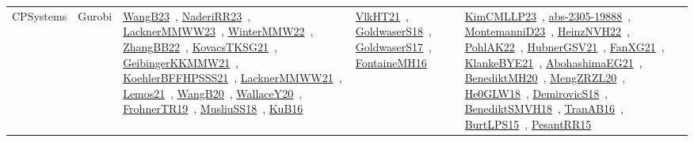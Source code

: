 {\begin{longtable}{lp{3cm}>{\raggedright\arraybackslash}p{6cm}>{\raggedright\arraybackslash}p{6cm}>{\raggedright\arraybackslash}p{8cm}}
CPSystems & Gurobi & \href{works/WangB23.pdf}{WangB23}~\cite{WangB23}, \href{works/NaderiRR23.pdf}{NaderiRR23}~\cite{NaderiRR23}, \href{works/LacknerMMWW23.pdf}{LacknerMMWW23}~\cite{LacknerMMWW23}, \href{works/WinterMMW22.pdf}{WinterMMW22}~\cite{WinterMMW22}, \href{works/ZhangBB22.pdf}{ZhangBB22}~\cite{ZhangBB22}, \href{works/KovacsTKSG21.pdf}{KovacsTKSG21}~\cite{KovacsTKSG21}, \href{works/GeibingerKKMMW21.pdf}{GeibingerKKMMW21}~\cite{GeibingerKKMMW21}, \href{works/KoehlerBFFHPSSS21.pdf}{KoehlerBFFHPSSS21}~\cite{KoehlerBFFHPSSS21}, \href{works/LacknerMMWW21.pdf}{LacknerMMWW21}~\cite{LacknerMMWW21}, \href{works/Lemos21.pdf}{Lemos21}~\cite{Lemos21}, \href{works/WangB20.pdf}{WangB20}~\cite{WangB20}, \href{works/WallaceY20.pdf}{WallaceY20}~\cite{WallaceY20}, \href{works/FrohnerTR19.pdf}{FrohnerTR19}~\cite{FrohnerTR19}, \href{works/MusliuSS18.pdf}{MusliuSS18}~\cite{MusliuSS18}, \href{works/KuB16.pdf}{KuB16}~\cite{KuB16} & \href{works/VlkHT21.pdf}{VlkHT21}~\cite{VlkHT21}, \href{works/GoldwaserS18.pdf}{GoldwaserS18}~\cite{GoldwaserS18}, \href{works/GoldwaserS17.pdf}{GoldwaserS17}~\cite{GoldwaserS17}, \href{works/FontaineMH16.pdf}{FontaineMH16}~\cite{FontaineMH16} & \href{works/KimCMLLP23.pdf}{KimCMLLP23}~\cite{KimCMLLP23}, \href{works/abs-2305-19888.pdf}{abs-2305-19888}~\cite{abs-2305-19888}, \href{works/MontemanniD23.pdf}{MontemanniD23}~\cite{MontemanniD23}, \href{works/HeinzNVH22.pdf}{HeinzNVH22}~\cite{HeinzNVH22}, \href{works/PohlAK22.pdf}{PohlAK22}~\cite{PohlAK22}, \href{works/HubnerGSV21.pdf}{HubnerGSV21}~\cite{HubnerGSV21}, \href{works/FanXG21.pdf}{FanXG21}~\cite{FanXG21}, \href{works/KlankeBYE21.pdf}{KlankeBYE21}~\cite{KlankeBYE21}, \href{works/AbohashimaEG21.pdf}{AbohashimaEG21}~\cite{AbohashimaEG21}, \href{works/BenediktMH20.pdf}{BenediktMH20}~\cite{BenediktMH20}, \href{works/MengZRZL20.pdf}{MengZRZL20}~\cite{MengZRZL20}, \href{works/He0GLW18.pdf}{He0GLW18}~\cite{He0GLW18}, \href{works/DemirovicS18.pdf}{DemirovicS18}~\cite{DemirovicS18}, \href{works/BenediktSMVH18.pdf}{BenediktSMVH18}~\cite{BenediktSMVH18}, \href{works/TranAB16.pdf}{TranAB16}~\cite{TranAB16}, \href{works/BurtLPS15.pdf}{BurtLPS15}~\cite{BurtLPS15}, \href{works/PesantRR15.pdf}{PesantRR15}~\cite{PesantRR15}\\

\end{longtable}}
